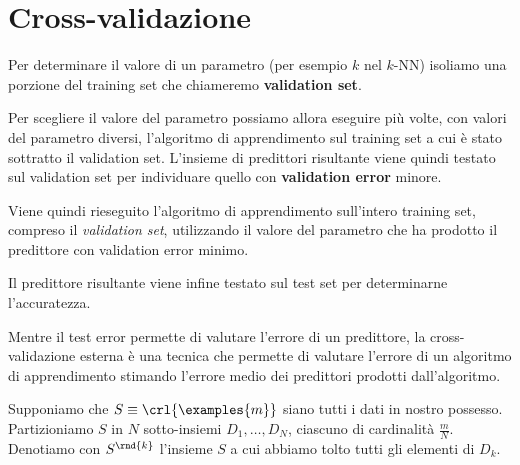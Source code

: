 \documentclass[\main/main.tex]{subfiles}
\begin{document}
\chapter{Cross-validazione}
\begin{multicols}{2}
    \begin{observation}
        Per determinare il valore di un parametro (per esempio \(k\) nel \(k\)-NN) isoliamo una porzione del training set che chiameremo \textbf{validation set}.
        
        Per scegliere il valore del parametro possiamo allora eseguire più volte, con valori del parametro diversi, l'algoritmo di apprendimento sul training set a cui è stato sottratto il validation set. L'insieme di predittori risultante viene quindi testato sul validation set per individuare quello con \textbf{validation error} minore.
        
        Viene quindi rieseguito l'algoritmo di apprendimento sull'intero training set, compreso il \textit{validation set}, utilizzando il valore del parametro che ha prodotto il predittore con validation error minimo. 
        
        Il predittore risultante viene infine testato sul test set per determinarne l'accuratezza.
    \end{observation}
    \begin{observation}
        Mentre il test error permette di valutare l'errore di un predittore, la cross-validazione esterna è una tecnica che permette di valutare l'errore di un algoritmo di apprendimento stimando l'errore medio dei predittori prodotti dall'algoritmo.
    \end{observation}
    \begin{observation}
        Supponiamo che \(S \equiv \crl{\examples{m}}\) siano tutti i dati in nostro possesso. Partizioniamo \(S\) in \(N\) sotto-insiemi \(D_1, \ldots, D_N\), ciascuno di cardinalità \(\frac{m}{N}\). Denotiamo con \(S^{\rnd{k}}\) l'insieme \(S\) a cui abbiamo tolto tutti gli elementi di \(D_k\).
        

\end{observation}
\end{multicols}
\end{document}
